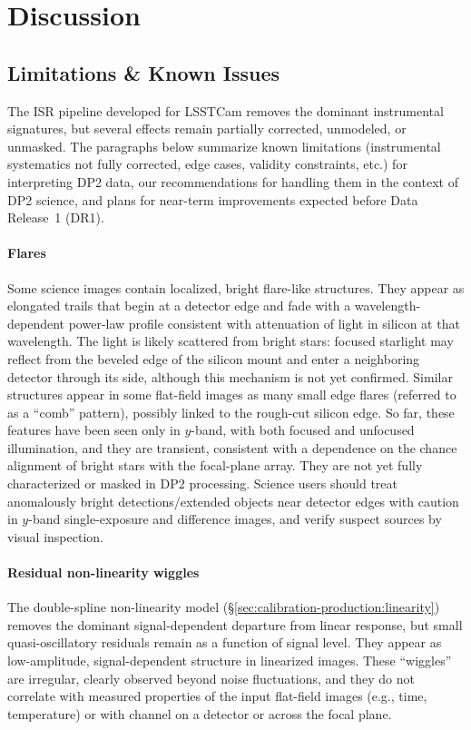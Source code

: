 \section{Discussion} \label{sec:discussion}

\subsection{Limitations \& Known Issues} \label{sec:discussion:limitations}

The ISR pipeline developed for LSSTCam removes the dominant instrumental signatures, but several effects remain partially corrected, unmodeled, or unmasked.
The paragraphs below summarize known limitations (instrumental systematics not fully corrected, edge cases, validity constraints, etc.) for interpreting DP2 data, our recommendations for handling them in the context of DP2 science, and plans for near-term improvements expected before Data Release~1 (DR1).

\paragraph{Flares}
Some science images contain localized, bright flare-like structures.
They appear as elongated trails that begin at a detector edge and fade with a wavelength-dependent power-law profile consistent with attenuation of light in silicon at that wavelength.
The light is likely scattered from bright stars: focused starlight may reflect from the beveled edge of the silicon mount and enter a neighboring detector through its side, although this mechanism is not yet confirmed.
Similar structures appear in some flat-field images as many small edge flares (referred to as a ``comb'' pattern), possibly linked to the rough-cut silicon edge.
So far, these features have been seen only in $y$-band, with both focused and unfocused illumination, and they are transient, consistent with a dependence on the chance alignment of bright stars with the focal-plane array.
They are not yet fully characterized or masked in DP2 processing.
Science users should treat anomalously bright detections/extended objects near detector edges with caution in $y$-band single-exposure and difference images, and verify suspect sources by visual inspection.

\paragraph{Residual non-linearity wiggles}
The double-spline non-linearity model (\S\ref{sec:calibration-production:linearity}) removes the dominant signal-dependent departure from linear response, but small quasi-oscillatory residuals remain as a function of signal level.
They appear as low-amplitude, signal-dependent structure in linearized images.
These ``wiggles'' are irregular, clearly observed beyond noise fluctuations, and they do not correlate with measured properties of the input flat-field images (e.g., time, temperature) or with channel on a detector or across the focal plane.

